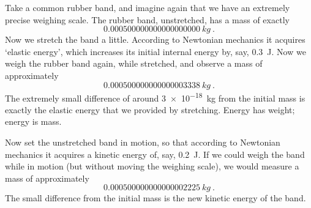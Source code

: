 \documentclass[a4paper,12pt,%
onecolumn,oneside,titlepage,%
british%
]{memoir}
\renewcommand*{\|}[1][]{\nonscript\:#1\vert\nonscript\:\mathopen{}}
\begin{document}
Take a common rubber band, and imagine again that we have an extremely precise weighing scale. The rubber band, unstretched, has a mass of exactly
\begin{equation*}
  \qty{0.000500000000000000000}{kg}\ .
\end{equation*}
Now we stretch the band a little. According to Newtonian mechanics it acquires \enquote*{elastic energy}, which increases its initial internal energy by, say, \qty{0.3}{J}.
Now we weigh the rubber band again, while stretched, and observe a mass of approximately
\begin{equation*}
  \qty{0.000500000000000003338}{kg} \ .
\end{equation*}
The extremely small difference of around \qty{3e-18}{kg} from the initial mass
is exactly the elastic energy that we provided by stretching.
%
%
Energy has weight; energy is mass.

Now set the unstretched band in motion, so that according to Newtonian mechanics it acquires a kinetic energy of, say, \qty{0.2}{J}. If we could weigh the band while in motion (but without moving the weighing scale), we would measure a mass of approximately
$$\qty{0.000500000000000002225}{kg} \ .$$
The small difference from the initial mass is the new kinetic energy of the band.
\end{document}
